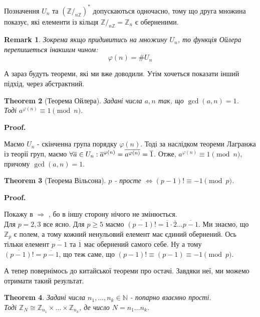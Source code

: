 \documentclass[a4paper, 10pt]{article}
\makeatletter
\theoremstyle{theoremdd}
\newtheorem{theorem}{Theorem}[subsection]
\theoremstyle{theoremdd}
\theoremstyle{theoremdd}
\theoremstyle{theoremdd}
\theoremstyle{theoremdd}
\theoremstyle{theoremdd}
\newtheorem{remark}[theorem]{Remark}
\theoremstyle{theoremdd}
\theoremstyle{theoremdd}
\def\rightproof{$\boxed{\Rightarrow}$ }
\renewenvironment{proof}[1][Proof.\\]{\par
\pushQED{\hfill \qed}%
\normalfont \topsep6\p@\@plus6\p@\relax
\trivlist
\item\relax
{\bfseries
#1\@addpunct{.}}\hspace\labelsep\ignorespaces
}{%
\popQED\endtrivlist\@endpefalse
}
\makeatother
\begin{document}
Позначення $U_n$ та $(\mathbb{Z}/_{n \mathbb{Z}})^*$ допускаються одночасно, тому що друга множина показує, які елементи із кільця $\mathbb{Z}/_{n \mathbb{Z}} = \mathbb{Z}_n$ є оберненими.

\begin{remark}
Зокрема якщо придивитись на множину $U_n$, то функція Ойлера перепишеться інакшим чином:
$$\varphi(n) = \# U_n$$
\end{remark}

А зараз будуть теореми, які ми вже доводили. Утім хочеться показати інший підхід, через абстрактний.
\begin{theorem}[Теорема Ойлера]
Задані числа $a,n$ так, що $\gcd(a,n) = 1$.\\
Тоді $a^{\varphi(n)} \equiv 1 \pmod n$.
\end{theorem}

\begin{proof}
Маємо $U_n$ - скінченна група порядку $\varphi(n)$. Тоді за наслідком теореми Лагранжа із теорії груп, маємо $\forall \overline{a} \in U_n: \\
\overline{a}^{\varphi(n)} = \overline{a^{\varphi(n)}} = \overline{1}$. Отже, $a^{\varphi(n)} \equiv 1 \pmod n$, причому $\gcd(a,n)=1$.
\end{proof}

\begin{theorem}[Теорема Вільсона]
$p$ - просте $\iff (p-1)! \equiv -1 \pmod p$.
\end{theorem}

\begin{proof}
Покажу в \rightproof, бо в іншу сторону нічого не змінюється. \\
Для $p = 2,3$ все ясно. Для $p \geq 5$ маємо $\overline{(p-1)!} = \overline{1} \cdot \overline{2} \dots \overline{p-1}$. Ми знаємо, що $\mathbb{Z}_p$ є полем, а тому кожний ненульовий елемент має єдиний обернений. Ось тільки елемент $\overline{p-1}$ та $\overline{1}$ має обернений самого себе. Ну а тому\\
$\overline{(p-1)!} = \overline{p-1}$, що теж саме, що $(p-1)! \equiv (p-1) \equiv -1 \pmod p$.
\end{proof}

А тепер повернімось до китайської теореми про остачі. Завдяки неї, ми можемо отримати такий результат.
\begin{theorem}
Задані числа $n_1,\dots,n_k \in \mathbb{N}$ - попарно взаємно прості.\\
Тоді $\mathbb{Z}_N \cong \mathbb{Z}_{n_1} \times \dots \times \mathbb{Z}_{n_k}$, де число $N = n_1 \dots n_k$.
\end{theorem}
\end{document}
